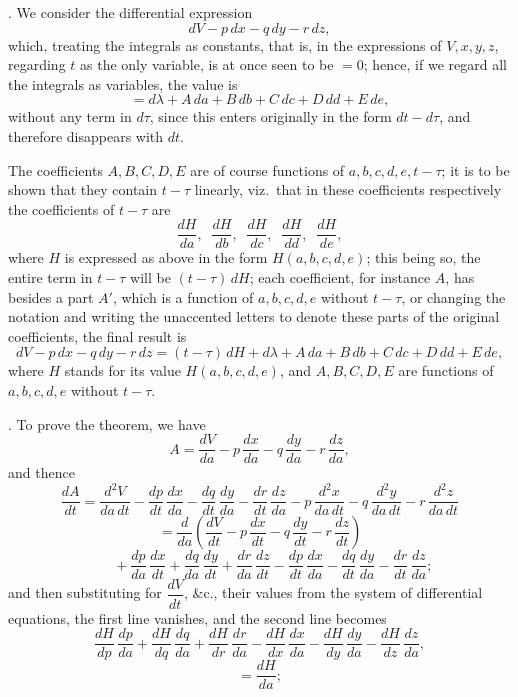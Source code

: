 \documentclass[11pt,a4paper]{article}
\begin{document}
. We consider the differential expression
\[
dV - p\,dx - q\,dy - r\,dz,
\]
which, treating the integrals as constants, that is, in the expressions of $V, x, y, z$, regarding $t$ as the only variable, is at once seen to be $= 0$; hence, if we regard all the integrals as variables, the value is
\[
= d\lambda + A\,da + B\,db + C\,dc + D\,dd + E\,de,
\]
without any term in $d\tau$, since this enters originally in the form $dt - d\tau$, and therefore disappears with $dt$.

The coefficients $A, B, C, D, E$ are of course functions of $a, b, c, d, e, t - \tau$; it is to be shown that they contain $t - \tau$ linearly, viz.\ that in these coefficients respectively the coefficients of $t - \tau$ are
\[
\frac{dH}{da}, \;\; \frac{dH}{db}, \;\; \frac{dH}{dc}, \;\; \frac{dH}{dd}, \;\; \frac{dH}{de},
\]
where $H$ is expressed as above in the form $H(a, b, c, d, e)$; this being so, the entire term in $t - \tau$ will be $(t - \tau)\,dH$; each coefficient, for instance $A$, has besides a part $A'$, which is a function of $a, b, c, d, e$ without $t - \tau$, or changing the notation and writing the unaccented letters to denote these parts of the original coefficients, the final result is
\[
dV - p\,dx - q\,dy - r\,dz = (t - \tau)\,dH + d\lambda + A\,da + B\,db + C\,dc + D\,dd + E\,de,
\]
where $H$ stands for its value $H(a, b, c, d, e)$, and $A, B, C, D, E$ are functions of $a, b, c, d, e$ without $t - \tau$.

\medskip

. To prove the theorem, we have
\[
A = \frac{dV}{da} - p\,\frac{dx}{da} - q\,\frac{dy}{da} - r\,\frac{dz}{da},
\]
and thence
\[
\frac{dA}{dt} = \frac{d^{2}V}{da\,dt} - \frac{dp}{dt}\,\frac{dx}{da} - \frac{dq}{dt}\,\frac{dy}{da} - \frac{dr}{dt}\,\frac{dz}{da} - p\,\frac{d^{2}x}{da\,dt} - q\,\frac{d^{2}y}{da\,dt} - r\,\frac{d^{2}z}{da\,dt}
\]
\[
= \frac{d}{da}\!\left( \frac{dV}{dt} - p\,\frac{dx}{dt} - q\,\frac{dy}{dt} - r\,\frac{dz}{dt} \right)
\]
\[
\phantom{=} \;\; + \frac{dp}{da}\,\frac{dx}{dt} + \frac{dq}{da}\,\frac{dy}{dt} + \frac{dr}{da}\,\frac{dz}{dt} - \frac{dp}{dt}\,\frac{dx}{da} - \frac{dq}{dt}\,\frac{dy}{da} - \frac{dr}{dt}\,\frac{dz}{da};
\]
and then substituting for $\dfrac{dV}{dt}$, \&c., their values from the system of differential equations, the first line vanishes, and the second line becomes
\[
\frac{dH}{dp}\,\frac{dp}{da} + \frac{dH}{dq}\,\frac{dq}{da} + \frac{dH}{dr}\,\frac{dr}{da} - \frac{dH}{dx}\,\frac{dx}{da} - \frac{dH}{dy}\,\frac{dy}{da} - \frac{dH}{dz}\,\frac{dz}{da},
\]
\[
= \frac{dH}{da};
\]
\end{document}
